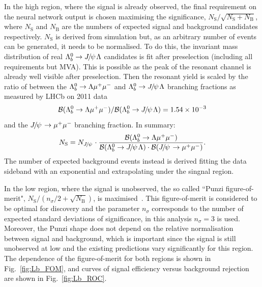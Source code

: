 In the high \qsq region, where the signal is already observed, the final requirement on the neural network output
is chosen maximising the significance, $N_{\mathrm{S}}/\sqrt{N_{\mathrm{S}}+N_{\mathrm{B}}}$, where
$N_\mathrm{S}$ and $N_\mathrm{B}$ are the numbers of expected signal and background candidates respectively.
$N_\mathrm{S}$ is derived from simulation but, as an arbitrary number of events can be generated, it
needs to be normalised. To do this, the invariant mass distribution of real $\Lb\to\jpsi\Lz$ candidates
is fit after preselection (including all requirements but MVA). This is possible as the peak of the resonant
channel is already well visible after preselection. Then the resonant yield is scaled by the ratio
of between the ${{\Lambda}^0_{b}}\rightarrow{\ensuremath{\Lambda}}{\ensuremath{\mu^+\mu^-}}$ and $\Lb\to\jpsi\Lz$ branching fractions as measured 
by LHCb on 2011 data 
\begin{equation}
\BR(\Lb\to\Lz\mumu) / \BR(\Lb\to\jpsi\Lz) =  1.54 \times 10^{-3}
\end{equation}
\noindent
and the $\jpsi\to\mumu$ branching fraction. In summary:
\begin{equation}
N_\mathrm{S} = N_\jpsi \cdot \frac{\BR(\Lb\to\Lz\mumu)}{\BR(\Lb\to\jpsi\Lz) \cdot \BR(\jpsi\to\mumu) }.
\end{equation}
%
The number of expected background events instead is derived fitting the data
sideband with an exponential and extrapolating under the singnal region.

In the low \qsq region, where the signal is unobserved, the so called ``Punzi figure-of-merit",
$N_{\mathrm{S}}/(n_\sigma/2+\sqrt{N_{\mathrm{B}}})$, is maximised~\cite{Punzi:2003bu}.
This figure-of-merit is considered to be optimal for discovery and the parameter $n_\sigma$ corresponds to
the number of expected standard deviations of significance, in this analysis $n_\sigma = 3$ is used.
Moreover, the Punzi shape does not depend on the relative normalisation between signal and background, which
is important since the signal is still unobserved at low \qsq and the existing predictions vary significantly
for this region. The dependence of the figure-of-merit for both \qsq regions is shown in Fig.~\ref{fig:Lb_FOM}, and curves
of signal efficiency versus background rejection are shown in Fig.~\ref{fig:Lb_ROC}.

